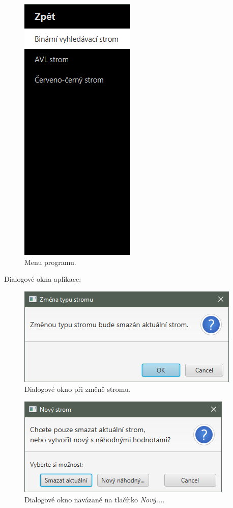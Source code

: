 \documentclass[
  biblatex=false,
  font=serif,
  glossaries=false,
  tables=false,
  theorems=false,
  index
]{kidiplom}
\begin{document}
\begin{figure}[h!]
\centering
	\includegraphics[scale=1]{obrazky/35Menu.png}
	\caption{Menu programu.}
	\label{menu}
\end{figure}

\newpage \noindent Dialogové okna aplikace:
\begin{figure}[h!]
\centering
	\includegraphics[scale=0.8]{obrazky/37Dialog2.png}
	\caption{Dialogové okno při změně stromu.}
	\label{dialogMenu}
\end{figure}

\begin{figure}[t!]
\centering
	\includegraphics[scale=0.8]{obrazky/36Dialog.png}
	\caption{Dialogové okno navázané na tlačítko \textit{Nový...}.}
	\label{dialogNovy}
\end{figure}
								
\end{document}
